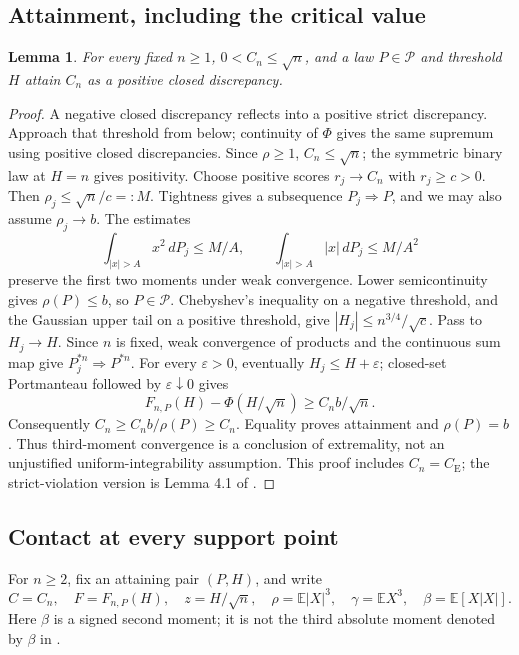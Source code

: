 \documentclass[11pt,a4paper]{article}
\numberwithin{equation}{section}
\newtheorem{lemma}[theorem]{Lemma}
\theoremstyle{definition}
\theoremstyle{remark}
\newcommand{\E}{\mathbb E}
\newcommand{\CE}{C_{\mathrm E}}
\newcommand{\cP}{\mathcal P}
\begin{document}
\subsection{Attainment, including the critical value}
\begin{lemma}\label{cut49:global:attainment}\label{cut49:found:orientation}
For every fixed $n\ge1$, $0<C_n\le\sqrt n$, and a law $P\in\cP$ and
threshold $H$ attain $C_n$ as a positive closed discrepancy.
\end{lemma}
\begin{proof}
A negative closed discrepancy reflects into a positive strict discrepancy.
Approach that threshold from below; continuity of $\Phi$ gives the same
supremum using positive closed discrepancies. Since $\rho\ge1$, $C_n\le\sqrt n$; the symmetric binary law at
$H=n$ gives positivity. Choose positive scores $r_j\to C_n$ with
$r_j\ge c>0$. Then $\rho_j\le\sqrt n/c=:M$. Tightness gives a subsequence
$P_j\Rightarrow P$, and we may also assume $\rho_j\to b$. The estimates
\[
 \int_{|x|>A}x^2\,dP_j\le M/A,\qquad
 \int_{|x|>A}|x|\,dP_j\le M/A^2
\]
preserve the first two moments under weak convergence. Lower
semicontinuity gives $\rho(P)\le b$, so $P\in\cP$.
Chebyshev's inequality on a negative threshold, and the Gaussian upper
tail on a positive threshold, give $|H_j|\le n^{3/4}/\sqrt c$.
Pass to $H_j\to H$. Since $n$ is fixed, weak convergence of products
and the continuous sum map give $P_j^{*n}\Rightarrow P^{*n}$.
For every $\varepsilon>0$, eventually $H_j\le H+\varepsilon$;
closed-set Portmanteau followed by $\varepsilon\downarrow0$ gives
\[
 F_{n,P}(H)-\Phi(H/\sqrt n)\ge C_nb/\sqrt n.
\]
Consequently $C_n\ge C_nb/\rho(P)\ge C_n$. Equality proves attainment
and $\rho(P)=b$. Thus third-moment convergence is a conclusion of
extremality, not an unjustified uniform-integrability assumption.
This proof includes $C_n=\CE$; the strict-violation version is
Lemma 4.1 of \cite{HC}.
\end{proof}

\subsection{Contact at every support point}
For $n\ge2$, fix an attaining pair $(P,H)$, and write
\[
 C=C_n,\quad F=F_{n,P}(H),\quad z=H/\sqrt n,\quad
 \rho=\E|X|^3,\quad\gamma=\E X^3,\quad\beta=\E[X|X|].
\]
Here $\beta$ is a signed second moment; it is not the third absolute
moment denoted by $\beta$ in \cite{HC}.
\end{document}
